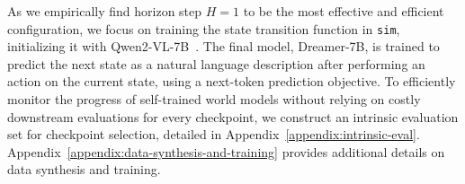 As we empirically find horizon step $H{=}1$ to be the most effective and efficient configuration, we focus on training the state transition function in \texttt{sim}, initializing it with Qwen2-VL-7B~\citep{Wang2024Qwen2VL}.
The final model, Dreamer-7B, is trained to predict the next state as a natural language description after performing an action on the current state, using a next-token prediction objective.
To efficiently monitor the progress of self-trained world models without relying on costly downstream evaluations for every checkpoint, we construct an intrinsic evaluation set for checkpoint selection, detailed in Appendix~\ref{appendix:intrinsic-eval}.
Appendix~\ref{appendix:data-synthesis-and-training} provides additional details on data synthesis and training.

